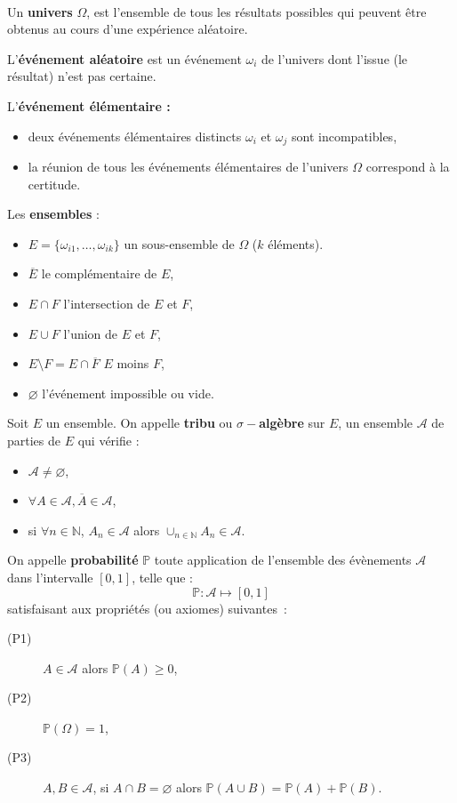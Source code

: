 
\begin{f}[Axiomatique]{\ }
	
	Un \textbf{univers} \(\Omega\), est l'ensemble de tous les résultats possibles qui peuvent être obtenus au cours d'une expérience aléatoire.
	
	L'\textbf{événement aléatoire} est un événement \(\omega_i\) de l'univers dont l'issue (le résultat) n'est pas certaine.
	
	
	L'\textbf{événement élémentaire :}
	\begin{itemize}
		\item deux événements élémentaires distincts \(\omega_i\) et \(\omega_j\) sont incompatibles,
		\item la réunion de tous les événements élémentaires de l'univers \(\Omega \) correspond à la certitude.
	\end{itemize}
	
	Les \textbf{ensembles} :
	\begin{itemize}
		\item  \(E=\lbrace \omega_{i1},\ldots , \omega_{ik}\rbrace\) un sous-ensemble de \(\Omega\) (\(k\) éléments).
		\item \(\overline{E}\) le complémentaire de \(E\),
		\item \(E\cap F\) l'intersection de \(E\) et \(F\),
		\item \(E\cup F\) l'union de \(E\) et \(F\),
		\item \(E\setminus F= E\cap\overline{F}\)  \(E\) moins \(F\),
		\item \(\varnothing\) l'événement impossible ou vide.
	\end{itemize}
	
	Soit \(E\) un ensemble. On appelle \textbf{tribu} ou \textbf{\(\sigma-\)algèbre} sur \(E\), un ensemble \(\mathcal{A}\) de parties de \(E\) qui vérifie :
	\begin{itemize}
		\item     \(\mathcal{A} \not=\varnothing\),
		\item     \(\forall A \in \mathcal{A} , \overline{A} \in\mathcal{A}\),
		\item     si \(\forall n \in \mathbb{N}\), \(A_n \in\mathcal{A}\) alors \(\cup_{n\in\mathbb{N} } A_n \in\mathcal{A}\).
	\end{itemize}
	
	On appelle \textbf{probabilité} \(\mathbb{P}\) toute application de l'ensemble des évènements \(\mathcal{A}\) dans l'intervalle \([0,1]\), telle que :      \[\mathbb{P} :      \mathcal{A}  \mapsto   [0,1]\]
	satisfaisant aux propriétés (ou axiomes) suivantes~:
	\begin{description}
		\item[(P1)] \(A \in \mathcal{A} \)    alors  \( \mathbb{P}(A) \geq 0\),
		\item[(P2)] \( \mathbb{P}(\Omega) = 1\),
		\item[(P3)] \(A, B \in \mathcal{A}\),  si  \(A\cap B =\varnothing\)    alors   \(\mathbb{P}(A\cup B)=\mathbb{P}(A) + \mathbb{P}(B)\).
	\end{description}
	

\end{f}
